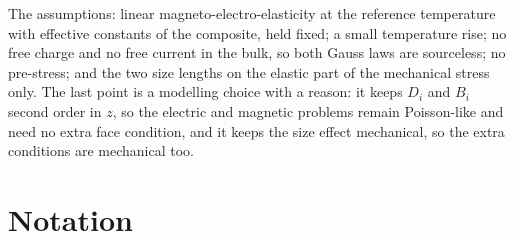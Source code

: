 \documentclass[11pt]{article}
\begin{document}
The assumptions: linear magneto-electro-elasticity at the reference temperature with effective constants
of the composite, held fixed; a small temperature rise; no free charge and no free current in the bulk, so
both Gauss laws are sourceless; no pre-stress; and the two size lengths on the elastic part of the
mechanical stress only. The last point is a modelling choice with a reason: it keeps $D_i$ and $B_i$
second order in $z$, so the electric and magnetic problems remain Poisson-like and need no extra face
condition, and it keeps the size effect mechanical, so the extra conditions are mechanical too.

\section{Notation}\label{sec:notation}
\end{document}
